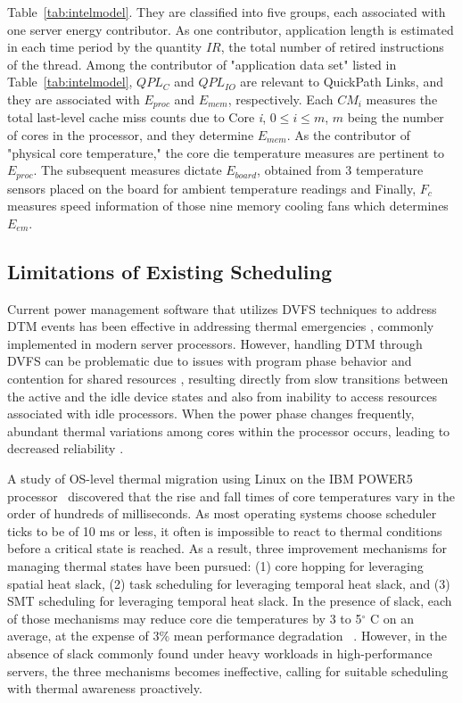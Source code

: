 \documentclass[times, 10pt,twocolumn]{IEEEtran}
\begin{document}
Table~\ref{tab:intelmodel}.  They are classified into five groups, each
associated with one server energy contributor.  As one contributor,
application length is estimated in each time period by the quantity
$IR$, the total number of retired instructions of the thread.  Among the
contributor of "application data set" listed in
Table~\ref{tab:intelmodel}, $QPL_{C}$ and $QPL_{IO}$ are relevant to
QuickPath Links, and they are associated with $E_{proc}$ and $E_{mem}$,
respectively.  Each $CM_{i}$ measures the total last-level cache miss
counts due to Core \textit{i}, $0 \leq i \leq m$, $m$ being the number
of cores in the processor, and they determine $E_{mem}$.  As the
contributor of "physical core temperature," the core die temperature
measures are pertinent to $E_{proc}$.  The subsequent measures dictate
$E_{board}$, obtained from 3 temperature sensors placed on the board for
ambient temperature readings and Finally, $F_{c}$ measures speed
information of those nine memory cooling fans which determines $E_{em}$.

\subsection{Limitations of Existing Scheduling}
\label{sec:shortc-comp-workl}
Current power management software that utilizes DVFS techniques to
address DTM events has been effective in addressing thermal emergencies
\cite{Donald2006,Hanson2007}, commonly implemented in modern server
processors.  However, handling DTM through DVFS
can be problematic due to issues with program phase behavior and
contention for shared resources \cite{Bircher2008,Coskun2008d},
resulting directly from slow transitions between the active and the idle
device states and also from inability to access resources associated
with idle processors.  When the power phase changes frequently, abundant
thermal variations among cores within the processor occurs, leading to
decreased reliability \cite{Coskun2008d,Kursun2009}.

A study of OS-level thermal migration using Linux on the IBM POWER5
processor~\cite{Choi2007} discovered that the rise and fall times of
core temperatures vary in the order of hundreds of milliseconds.  As
most operating systems choose scheduler ticks to be of 10 ms or less, it
often is impossible to react to thermal conditions before a critical
state is reached.  As a result, three improvement mechanisms for
managing thermal states have been pursued: (1) core hopping for
leveraging spatial heat slack, (2) task scheduling for leveraging
temporal heat slack, and (3) SMT scheduling for leveraging temporal heat
slack.  In the presence of slack, each of those mechanisms may reduce
core die temperatures by 3 to 5$^{\circ}$ C on an average, at the
expense of 3\% mean performance degradation ~\cite{Choi2007,Ayoub2011}.
However, in the absence of slack commonly found under heavy workloads in
high-performance servers, the three mechanisms becomes ineffective,
calling for suitable scheduling with thermal awareness proactively.
\end{document}
